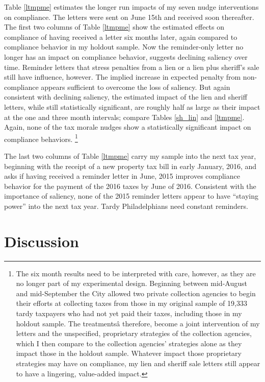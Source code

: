 Table \ref{ltmpme} estimates the longer run impacts of my seven nudge
interventions on compliance.  The letters were sent on June 15th and
received soon thereafter.  The first two columns of Table \ref{ltmpme}
show the estimated effects on compliance of having received a letter
six months later, again compared to compliance behavior in my holdout
sample.  Now the reminder-only letter no longer has an impact on
compliance behavior, suggests declining saliency over time.  Reminder
letters that stress penalties from a lien or a lien plus sheriff's
sale still have influence, however.  The implied increase in expected
penalty from non-compliance appears sufficient to overcome the loss of
saliency.  But again consistent with declining saliency, the estimated
impact of the lien and sheriff letters, while still statistically
significant, are roughly half as large as their impact at the one and
three month intervals; compare Tables \ref{sh_lin} and \ref{ltmpme}.
Again, none of the tax morale nudges show a statistically significant
impact on compliance behaviors. \footnote{The six month results need
  to be interpreted with care, however, as they are no longer part of
  my experimental design.  Beginning between mid-August and
  mid-September the City allowed two private collection agencies to
  begin their efforts at collecting taxes from those in my original
  sample of 19,333 tardy taxpayers who had not yet paid their taxes,
  including those in my holdout sample.  The treatmentsâ therefore,
  become a joint intervention of my letters and the unspecified,
  proprietary strategies of the collection agencies, which I then
  compare to the collection agencies' strategies alone as they impact
  those in the holdout sample.  Whatever impact those proprietary
  strategies may have on compliance, my lien and sheriff sale letters
  still appear to have a lingering, value-added impact.}

The last two columns of Table \ref{ltmpme} carry my sample into the
next tax year, beginning with the receipt of a new property tax bill
in early January, 2016, and asks if having received a reminder letter
in June, 2015 improves compliance behavior for the payment of the 2016
taxes by June of 2016.  Consistent with the importance of saliency,
none of the 2015 reminder letters appear to have ``staying power'' into
the next tax year.  Tardy Philadelphians need constant reminders.

\section{Discussion}

